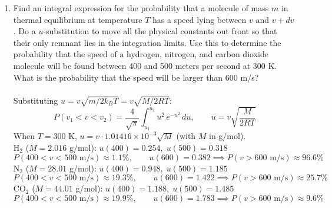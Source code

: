 \documentclass{article}
\begin{document}
\begin{enumerate}
\begin{enumerate}
            \item Find an integral expression for the probability that a molecule of mass $m$ in thermal equilibrium at temperature $T$ has a speed lying between $v$ and $v+dv$. Do a $u$-substitution to move all the physical constants out front so that their only remnant lies in the integration limits. Use this to determine the probability that the speed of a hydrogen, nitrogen, and carbon dioxide molecule will be found between 400 and 500 meters per second at 300 K. What is the probability that the speed will be larger than 600 m/s?
            \\
            \\Substituting $u = v\sqrt{m/2k_BT} = v\sqrt{M/2RT}$:
            \[P(v_1 < v < v_2) = \frac{4}{\sqrt{\pi}}\int_{u_1}^{u_2} u^2\,e^{-u^2}\,du, \qquad u = v\sqrt{\frac{M}{2RT}}\]
            When $T=300$ K, $u = v\cdot 1.01416\times10^{-3}\sqrt{M}$ (with $M$ in g/mol).
            \\
            {H}$_2$ ($M=2.016$ g/mol): $u(400)=0.254,\;u(500)=0.318$
            \[P(400<v<500\text{ m/s}) \approx \boxed{1.1\%}, \qquad u(600)=0.382 \implies P(v>600\text{ m/s}) \approx \boxed{96.6\%}\]
            {N}$_2$ ($M=28.01$ g/mol): $u(400)=0.948,\;u(500)=1.185$
            \[P(400<v<500\text{ m/s}) \approx \boxed{19.3\%}, \qquad u(600)=1.422 \implies P(v>600\text{ m/s}) \approx \boxed{25.7\%}\]
            {CO}$_2$ ($M=44.01$ g/mol): $u(400)=1.188,\;u(500)=1.485$
            \[P(400<v<500\text{ m/s}) \approx \boxed{19.9\%}, \qquad u(600)=1.783 \implies P(v>600\text{ m/s}) \approx \boxed{9.6\%}\]
        \end{enumerate}

    \end{enumerate}
\end{document}
